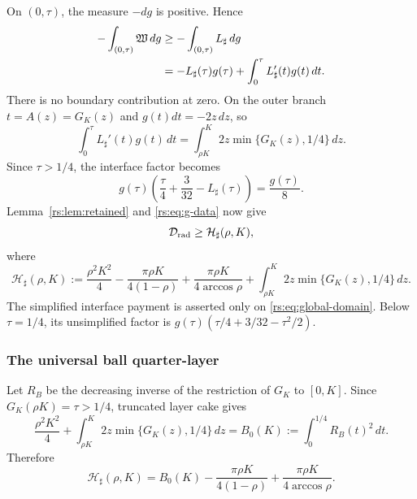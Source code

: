 On $(0,\tau)$, the measure $-dg$ is positive.  Hence
\begin{align}
 -\int_{(0,\tau)}\mathfrak W\,dg
 &\geq -\int_{(0,\tau)}L_\sharp\,dg \notag\\
 &=-L_\sharp(\tau)g(\tau)
   +\int_0^\tau L_\sharp'(t)g(t)\,dt.
 \label{rs:eq:R-sharp-parts}
\end{align}
There is no boundary contribution at zero.  On the outer branch
$t=A(z)=G_K(z)$ and $g(t)dt=-2z\,dz$, so
\begin{equation}
 \int_0^\tau L_\sharp'(t)g(t)\,dt
 =\int_{\rho K}^K2z\min\{G_K(z),1/4\}\,dz.
 \label{rs:eq:R-sharp-action}
\end{equation}
Since $\tau>1/4$, the interface factor becomes
\[
 g(\tau)\left(\frac\tau4+\frac3{32}-L_\sharp(\tau)\right)
 =\frac{g(\tau)}8.
\]
Lemma~\ref{rs:lem:retained} and \eqref{rs:eq:g-data} now give
\begin{equation}
 \mathcal D_{\rm rad}\geq\mathcal H_\sharp(\rho,K),
 \label{rs:eq:H-sharp-bound}
\end{equation}
where
\begin{equation}
 \mathcal H_\sharp(\rho,K):=
 \frac{\rho^2K^2}{4}
 -\frac{\pi\rho K}{4(1-\rho)}
 +\frac{\pi\rho K}{4\arccos\rho}
 +\int_{\rho K}^K2z\min\{G_K(z),1/4\}\,dz.
 \label{rs:eq:H-sharp}
\end{equation}
The simplified interface payment is asserted only on
\eqref{rs:eq:global-domain}.  Below $\tau=1/4$, its unsimplified factor is
$g(\tau)(\tau/4+3/32-\tau^2/2)$.

\subsubsection*{The universal ball quarter-layer}

Let $R_B$ be the decreasing inverse of the restriction of $G_K$ to
$[0,K]$.  Since
$G_K(\rho K)=\tau>1/4$, truncated layer cake gives
\begin{equation}
 \frac{\rho^2K^2}{4}
 +\int_{\rho K}^K2z\min\{G_K(z),1/4\}\,dz
 =B_0(K):=\int_0^{1/4}R_B(t)^2\,dt.
 \label{rs:eq:ball-layer}
\end{equation}
Therefore
\begin{equation}
 \mathcal H_\sharp(\rho,K)
 =B_0(K)-\frac{\pi\rho K}{4(1-\rho)}
 +\frac{\pi\rho K}{4\arccos\rho}.
 \label{rs:eq:H-ball}
\end{equation}

